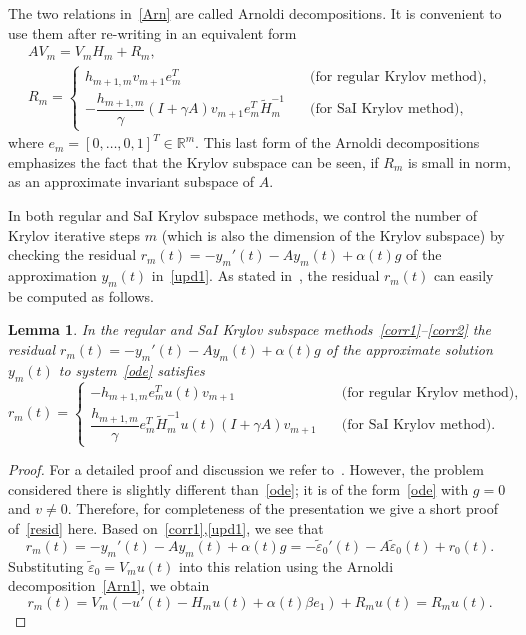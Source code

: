 \documentclass[11pt]{elsarticle}
\newcommand{\eps}{\varepsilon}
\newcommand{\Rr}{\mathbb{R}}
\newtheorem{lemma}{Lemma}
\begin{document}
The two relations in~\eqref{Arn} are called Arnoldi 
decompositions.
It is convenient to use them after re-writing in an equivalent form  
\begin{equation}
\label{Arn1}
\begin{gathered}
AV_m = V_m H_m + R_m,
\\
R_m =
\begin{cases}
h_{m+1,m}v_{m+1}e_m^T
\quad &\text{(for regular Krylov method)},
\\
-\dfrac{h_{m+1,m}}{\gamma}(I+\gamma A)v_{m+1}e_m^T\tilde{H}_m^{-1}
\quad &\text{(for SaI Krylov method)},
\end{cases}
\end{gathered}
\end{equation}
where $e_m=[0,\dots,0,1]^T\in\Rr^m$.
This last form of the Arnoldi decompositions 
emphasizes the fact that the Krylov subspace can
be seen, if $R_m$ is small in norm, as an approximate invariant
subspace of $A$.

In both regular and SaI Krylov subspace methods, we control the number
of Krylov iterative steps $m$ (which is also the dimension
of the Krylov subspace) by checking the residual 
$r_m(t)=-y_m'(t)-Ay_m(t)+\alpha(t)g$ 
of the approximation $y_m(t)$ in~\eqref{upd1}.
As stated 
in~\cite{CelledoniMoret97,DruskinGreenbaumKnizhnerman98,BGH13}, 
the residual $r_m(t)$ can easily be computed as follows.

\begin{lemma}\cite{BGH13}
In the regular and SaI Krylov subspace methods~\eqref{corr1}--\eqref{corr2}
the residual $r_m(t)=-y_m'(t)-Ay_m(t)+\alpha(t)g$ 
of the approximate solution $y_m(t)$ to system~\eqref{ode}  
satisfies
\begin{equation}
\label{resid}
r_m(t) = 
\begin{cases}
-h_{m+1,m} e_m^Tu(t) v_{m+1}
\quad &\text{(for regular Krylov method)},
\\  
\dfrac{h_{m+1,m}}{\gamma} e_m^T \tilde{H}_m^{-1} u(t) (I+\gamma A)v_{m+1}
\quad &\text{(for SaI Krylov method)}.
\end{cases}
\end{equation}
\end{lemma}

\begin{proof}
For a detailed proof and discussion we refer to~\cite{BGH13}.
However, the problem considered there
is slightly different than~\eqref{ode}; it is of the form~\eqref{ode}
with $g=0$ and $v\ne 0$.
Therefore, for completeness of the presentation we give
a short proof of~\eqref{resid} here.
Based on~\eqref{corr1},\eqref{upd1}, we see that
$$
r_m(t)=-y_m'(t)-Ay_m(t)+\alpha(t)g = 
-\tilde{\eps}_0'(t)-A\tilde{\eps}_0(t) + r_0(t).
$$
Substituting $\tilde{\eps}_0=V_mu(t)$ into this relation
using the Arnoldi decomposition~\eqref{Arn1}, we obtain
$$
r_m(t) = V_m(-u'(t)-H_mu(t) +\alpha(t)\beta e_1) + R_mu(t)=
R_m u(t).
$$
\end{proof}
\end{document}
